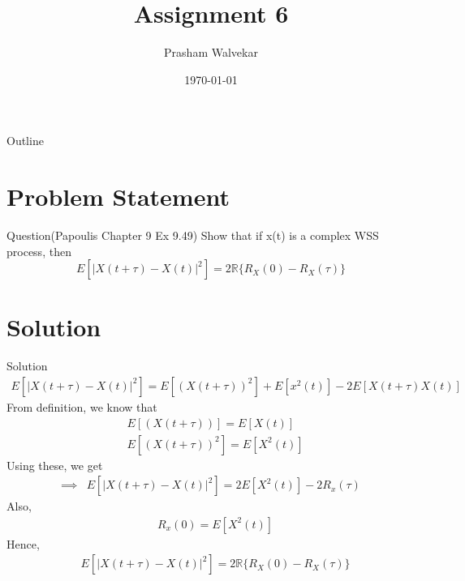 \documentclass{beamer}
\title{Assignment 6}
\author{Prasham Walvekar}
\date{\today}
\providecommand{\brak}[1]{\ensuremath{\left(#1\right)}}
\begin{document}
\begin{frame}
    \titlepage
\end{frame}

\logo{}


\begin{frame}{Outline}
    \tableofcontents
\end{frame}

\section{Problem Statement}
\begin{frame}{Question(Papoulis Chapter 9 Ex 9.49)}
    Show that if x(t) is a complex WSS process, then
    $${ E[{|X\brak{t + \tau } - X\brak{t}|}^2 ] = 2\mathbb{R} \{R_{X}\brak{0} - R_{X}\brak{\tau}\}}$$
\end{frame}

\section{Solution}
\begin{frame}{Solution}
\begin{align}
     E[{|X\brak{t +\tau} - X\brak{t}|}^2 ] = E[\brak{X\brak{t + \tau}}^{2}] + E[x^{2}\brak{t}] - 2E[X\brak{t +\tau } X\brak{t}]
     \end{align}
    From definition, we know that
    \begin{align}
    &{E[\brak{X\brak{t + \tau}}] = E[X\brak{t}]}\\
    &{E[\brak{X\brak{t + \tau}}^{2}] = E[X^{2}\brak{t}]}
    \end{align}
    Using these, we get
    \begin{align}
    \implies &{E[{|X\brak{t + \tau } - X\brak{t}|}^2 ] = 2E[X^{2}\brak{t}] - 2R_{x}\brak{\tau}}
    \end{align}
    Also,
    \begin{align}
    &{R_{x}\brak{0}= E[X^{2}\brak{t}]}
    \end{align}
     Hence,
    \begin{align}
     &{ E[{|X\brak{t + \tau } - X\brak{t}|}^2 ] = 2\mathbb{R} \{R_{X}\brak{0} - R_{X}\brak{\tau}\}}
    \end{align}
\end{frame}
\end{document}
